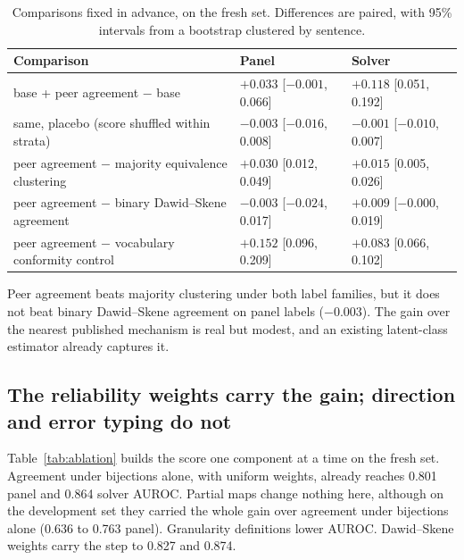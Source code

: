 \documentclass[11pt,letterpaper]{article}
\begin{document}
\begin{table}[!htbp]
  \centering
  \small
  \caption{Comparisons fixed in advance, on the fresh set. Differences are paired, with 95\% intervals from a bootstrap clustered by sentence.}
  \label{tab:tests}
  \begin{tabular}{lll}
    \toprule
    Comparison & Panel & Solver \\
    \midrule
    base + peer agreement $-$ base & $+0.033$ [$-0.001$, 0.066] & $+0.118$ [0.051, 0.192] \\
    same, placebo (score shuffled within strata) & $-0.003$ [$-0.016$, 0.008] & $-0.001$ [$-0.010$, 0.007] \\
    peer agreement $-$ majority equivalence clustering & $+0.030$ [0.012, 0.049] & $+0.015$ [0.005, 0.026] \\
    peer agreement $-$ binary Dawid--Skene agreement & $-0.003$ [$-0.024$, 0.017] & $+0.009$ [$-0.000$, 0.019] \\
    peer agreement $-$ vocabulary conformity control & $+0.152$ [0.096, 0.209] & $+0.083$ [0.066, 0.102] \\
    \bottomrule
  \end{tabular}
\end{table}

Peer agreement beats majority clustering under both label families, but it does not beat binary Dawid--Skene agreement on panel labels ($-0.003$). The gain over the nearest published mechanism \citep{Li2024} is real but modest, and an existing latent-class estimator already captures it.

\subsection{The reliability weights carry the gain; direction and error typing do not}
\label{sec:ablation}

Table~\ref{tab:ablation} builds the score one component at a time on the fresh set. Agreement under bijections alone, with uniform weights, already reaches 0.801 panel and 0.864 solver AUROC. Partial maps change nothing here, although on the development set they carried the whole gain over agreement under bijections alone (0.636 to 0.763 panel). Granularity definitions lower AUROC. Dawid--Skene weights carry the step to 0.827 and 0.874.
\end{document}
